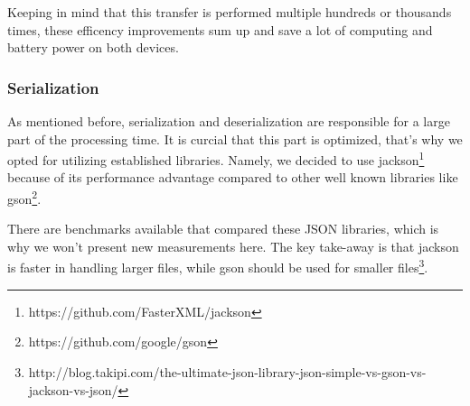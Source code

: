 Keeping in mind that this transfer is performed multiple hundreds or thousands times, these efficency improvements sum up and save a lot of computing and battery power on both devices.

\subsubsection{Serialization}
As mentioned before, serialization and deserialization are responsible for a large part of the processing time.
It is curcial that this part is optimized, that's why we opted for utilizing established libraries.
Namely, we decided to use jackson\footnote{https://github.com/FasterXML/jackson} because of its performance advantage compared to other well known libraries like gson\footnote{https://github.com/google/gson}.

There are benchmarks available that compared these JSON libraries, which is why we won't present new measurements here.
The key take-away is that jackson is faster in handling larger files, while gson should be used for smaller files\footnote{http://blog.takipi.com/the-ultimate-json-library-json-simple-vs-gson-vs-jackson-vs-json/}.

\clearpage